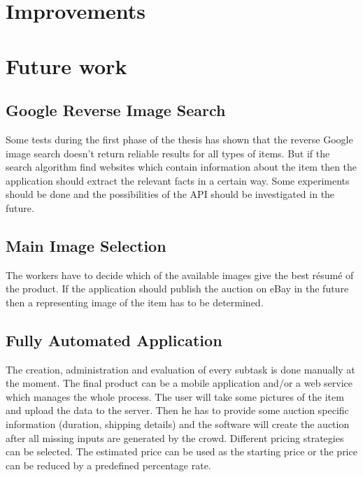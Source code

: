 \section{Improvements}
\section{Future work}
\subsection{Google Reverse Image Search}
Some tests during the first phase of the thesis has shown that the reverse Google image search doesn't return reliable results for all types of items. But if the search algorithm find websites which contain information about the item then the application should extract the relevant facts in a certain way. Some experiments should be done and the possibilities of the API should be investigated in the future. 
\subsection{Main Image Selection}
The workers have to decide which of the available images give the best résumé of the product. If the application should publish the auction on eBay in the future then a representing image of the item has to be determined. 
\subsection{Fully Automated Application}
The creation, administration and evaluation of every subtask is done manually at the moment. The final product can be a mobile application and/or a web service which manages the whole process. The user will take some pictures of the item and upload the data to the server. Then he has to provide some auction specific information (duration, shipping details) and the software will create the auction after all missing inputs are generated by the crowd. Different pricing strategies can be selected. The estimated price can be used as the starting price or the price can be reduced by a predefined percentage rate. 
